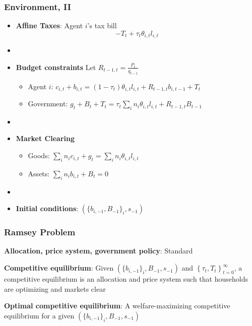 \documentclass{beamer}
\begin{document}
\begin{frame}
 \frametitle{Environment, II}
 \begin{itemize}
  \item \textbf{Affine Taxes}: Agent $i$'s tax bill
\[- T_t + \tau_t \theta_{i,t}l_{i,t}\]

\item[]
  \item \textbf{Budget constraints} Let $R_{t-1,t}=\frac{P_t}{q_{t-1}}$
  \begin{itemize}
   \item Agent $i$: $ c_{i,t}+b_{i,t}=\left( 1-\tau _{t}\right) \theta _{i,t}l_{i,t}+R_{t-1,t}b_{i,t-1}+T_{t}$
\item Government: $g_{t}+B_{t}+T_t=\tau _{t}\sum_i n_i \theta_{i,t}l_{i,t}+R_{t-1,t}B_{t-1}$
  \end{itemize}

\item[]
  \item \textbf{Market Clearing}
  \begin{itemize}
   \item Goods: $\sum_{i}n_ic_{i,t}+g_t =\sum_i n_i \theta _{i,t} l_{i,t}$

   \item Assets: $\sum_{i}n_ib_{i,t} +B_{t}=0$

  \end{itemize}
  \item[]

\item \textbf{Initial conditions}:  $(\{b_{i,-1},B_{-1}\}_i,s_{-1})$
\end{itemize}
\end{frame}



\begin{frame}
 \frametitle{Ramsey Problem}
\label{ramsey-problem}
\begin{definition}
\textbf{Allocation, price system, government policy}: Standard

\end{definition}

\begin{definition}
\textbf{Competitive equilibrium}: Given $\left(\{b_{i,-1}\}_i,B_{-1},s_{-1}\right) $ and $\left\{ \tau _{t},T_{t}\right\} _{t=0}^{\infty }$, a competitive equilibrium is an allocation and price system such that households are optimizing and markets clear 
\end{definition}

\begin{definition}
\textbf{Optimal competitive equilibrium}: A welfare-maximizing competitive
equilibrium for a given $\left( \{b_{i,-1}\}_i,B_{-1},s_{-1}\right) $
\end{definition}
 \end{frame}
\end{document}
